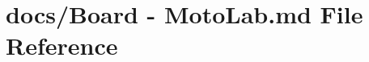 \hypertarget{Board_01-_01MotoLab_8md}{\section{docs/\+Board -\/ Moto\+Lab.\+md File Reference}
\label{Board_01-_01MotoLab_8md}
}
